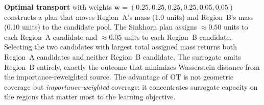 \begin{foldable}
  \textbf{Optimal transport} with weights $\mathbf{w} = (0.25, 0.25, 0.25, 0.25, 0.05, 0.05)$ constructs a plan that moves Region~A's mass (1.0 units) and Region~B's mass (0.10 units) to the candidate pool.
  The Sinkhorn plan assigns $\approx 0.50$ units to each Region~A candidate and $\approx 0.05$ units to each Region~B candidate.
  Selecting the two candidates with largest total assigned mass returns both Region~A candidates and neither Region~B candidate.
  The surrogate omits Region~B entirely, exactly the outcome that minimizes Wasserstein distance from the importance-reweighted source.
  The advantage of \ac{OT} is not geometric coverage but \textit{importance-weighted} coverage: it concentrates surrogate capacity on the regions that matter most to the learning objective.
\end{foldable}
